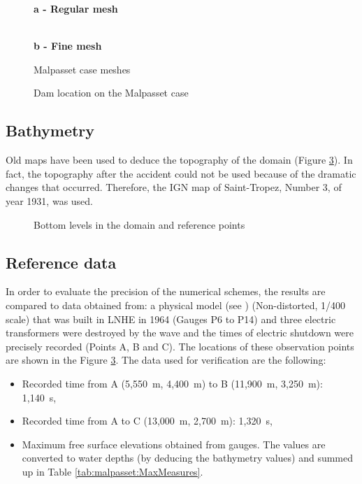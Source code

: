 \begin{figure}[H]
  \centering
  \textbf{a - Regular mesh}\par\medskip
   \\
  \textbf{b - Fine mesh}\par\medskip
  \caption{Malpasset case meshes}\label{fig:malpasset:Mesh}
\end{figure}

\begin{figure}[H] %
  \centering
  \caption{Dam location on the Malpasset case}\label{fig:malpasset:mesh_dam}
\end{figure}

\subsection{Bathymetry}
Old maps have been used to deduce the topography of the domain
(Figure \ref{fig:malpasset:bathy}).
In fact, the topography after the accident could not be used because of the
dramatic changes that occurred.
Therefore, the IGN map of Saint-Tropez, Number 3, of year 1931, was used.

\begin{figure}[H] %
  \centering
  \caption{Bottom levels in the domain and reference points}\label{fig:malpasset:bathy}
\end{figure}

\subsection{Reference data}
In order to evaluate the precision of the numerical schemes, the results are
compared to data obtained from:
a physical model (see \cite{Hervouet2007}) (Non-distorted, 1/400 scale) that was
built in LNHE in 1964 (Gauges P6 to P14) and three electric transformers were
destroyed by the wave and the times of electric shutdown were precisely recorded
(Points A, B and C).
The locations of these observation points are shown in the Figure
\ref{fig:malpasset:bathy}.
The data used for verification are the following:
\begin{itemize}
\item Recorded time from A (5,550~m, 4,400~m) to B (11,900~m, 3,250~m): 1,140~s,
\item Recorded time from A to C (13,000~m, 2,700~m): 1,320~s,
\item Maximum free surface elevations obtained from gauges.
The values are converted to water depths (by deducing the bathymetry values) and
summed up in Table \ref{tab:malpasset:MaxMeasures}.
\end{itemize}

